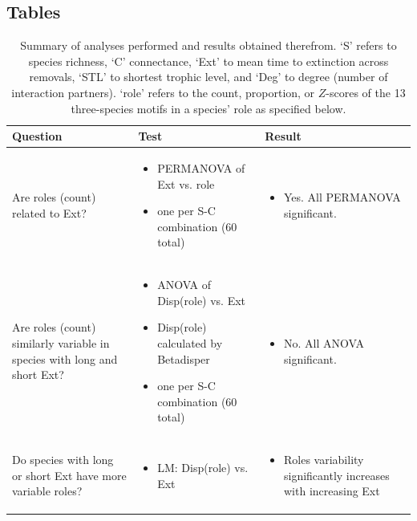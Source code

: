 \documentclass[12pt]{article}
\begin{document}
\begin{landscape}
\section*{Tables}

    \begin{table}[h!]
        \centering
        \caption{Summary of analyses performed and results obtained therefrom. `S' refers to species richness, `C' connectance, `Ext' to mean time to extinction across removals, `STL' to shortest trophic level, and `Deg' to degree (number of interaction partners). `role' refers to the count, proportion, or $Z$-scores of the 13 three-species motifs in a species' role as specified below. }
        \label{overview_table}
        \footnotesize
        \begin{tabular}{m{6cm}|m{7.5cm}|m{8cm}}
        Question & Test & Result \\
        \hline
        Are roles (count) related to Ext? & 
        \begin{itemize}
            \item PERMANOVA of Ext vs. role
            \item one per S-C combination (60 total)
        \end{itemize} 
        & \begin{itemize} \item Yes. All PERMANOVA significant. \end{itemize} \\
        Are roles (count) similarly variable in species with long and short Ext? & 
        \begin{itemize}
            \item ANOVA of Disp(role) vs. Ext
            \item Disp(role) calculated by Betadisper
            \item one per S-C combination (60 total)
        \end{itemize}
        & \begin{itemize} \item No. All ANOVA significant. \end{itemize} \\
        Do species with long or short Ext have more variable roles? & \begin{itemize}
            \item LM: Disp(role) vs. Ext
        \end{itemize} & \begin{itemize} \item Roles variability significantly increases with increasing Ext \end{itemize} \\

\end{tabular}
\end{table}
\end{landscape}
\end{document}
